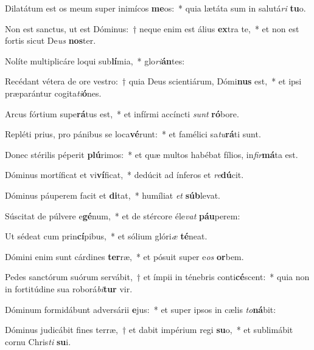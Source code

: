 \item Dilatátum est os meum super inimícos \textbf{me}os:~* quia lætáta sum in salutá\textit{ri} \textbf{tu}o.
\item Non est sanctus, ut est Dóminus:~† neque enim est álius \textbf{ex}tra te,~* et non est fortis sicut De\textit{us} \textbf{nos}ter.
\item Nolíte multiplicáre loqui sub\textbf{lí}mia,~* glo\textit{ri}\textbf{án}tes:
\item Recédant vétera de ore vestro:~† quia Deus scientiárum, Dómi\textbf{nus} est,~* et ipsi præparántur cogita\textit{ti}\textbf{ó}nes.
\item Arcus fórtium supe\textbf{rá}tus est,~* et infírmi accíncti \textit{sunt} \textbf{ró}bore.
\item Repléti prius, pro pánibus se loca\textbf{vé}runt:~* et famélici sa\textit{tu}\textbf{rá}ti sunt.
\item Donec stérilis péperit \textbf{plú}rimos:~* et quæ multos habébat fílios, in\textit{fir}\textbf{má}ta est.
\item Dóminus mortíficat et vi\textbf{ví}ficat,~* dedúcit ad ínferos et \textit{re}\textbf{dú}cit.
\item Dóminus páuperem facit et \textbf{di}tat,~* humíliat \textit{et} \textbf{súb}levat.
\item Súscitat de púlvere e\textbf{gé}num,~* et de stércore éle\textit{vat} \textbf{páu}perem:
\item Ut sédeat cum prin\textbf{cí}pibus,~* et sólium glóri\textit{æ} \textbf{té}neat.
\item Dómini enim sunt cárdines \textbf{ter}ræ,~* et pósuit super e\textit{os} \textbf{or}bem.
\item Pedes sanctórum suórum servábit,~† et ímpii in ténebris conti\textbf{cé}scent:~* quia non in fortitúdine sua roborá\textit{bi}\textbf{tur} vir.
\item Dóminum formidábunt adversárii \textbf{e}jus:~* et super ipsos in cælis \textit{to}\textbf{ná}bit:
\item Dóminus judicábit fines terræ,~† et dabit impérium regi \textbf{su}o,~* et sublimábit cornu Chris\textit{ti} \textbf{su}i.
